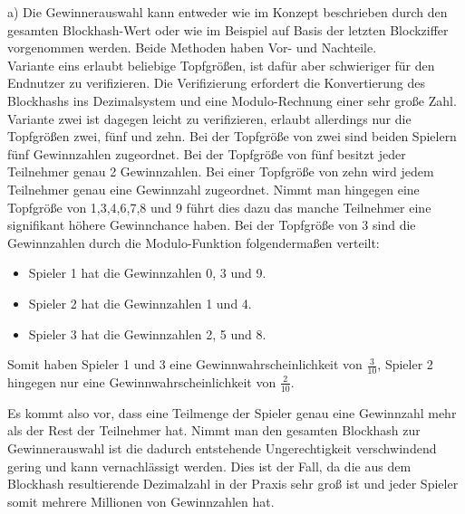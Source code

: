 a) Die Gewinnerauswahl kann entweder wie im Konzept beschrieben durch den gesamten Blockhash-Wert oder wie im Beispiel auf Basis der letzten Blockziffer vorgenommen werden.
Beide Methoden haben Vor- und Nachteile.\\ Variante eins erlaubt beliebige Topfgrößen, ist dafür aber schwieriger für den Endnutzer zu verifizieren. Die Verifizierung erfordert die Konvertierung des Blockhashs ins Dezimalsystem und eine Modulo-Rechnung einer sehr große Zahl.\\ Variante zwei ist dagegen leicht zu verifizieren, erlaubt allerdings nur die Topfgrößen zwei, fünf und zehn. Bei der Topfgröße von zwei sind beiden Spielern fünf Gewinnzahlen zugeordnet. Bei der Topfgröße von fünf besitzt jeder Teilnehmer genau 2 Gewinnzahlen. Bei einer Topfgröße von zehn wird jedem Teilnehmer genau eine Gewinnzahl zugeordnet. 
Nimmt man hingegen eine Topfgröße von 1,3,4,6,7,8 und 9 führt dies dazu das manche Teilnehmer eine signifikant höhere Gewinnchance haben.
Bei der Topfgröße von 3 sind die Gewinnzahlen durch die Modulo-Funktion folgendermaßen verteilt:
\begin{itemize}
\item Spieler 1 hat die Gewinnzahlen 0, 3 und 9.
\item Spieler 2 hat die Gewinnzahlen 1 und 4.
\item Spieler 3 hat die Gewinnzahlen 2, 5 und 8.
\end{itemize}
Somit haben Spieler 1 und 3 eine Gewinnwahrscheinlichkeit von $\frac{3}{10}$, Spieler 2 hingegen nur eine Gewinnwahrscheinlichkeit von $\frac{2}{10}$.

Es kommt also vor, dass eine Teilmenge der Spieler genau eine Gewinnzahl mehr als der Rest der Teilnehmer hat.
Nimmt man den gesamten Blockhash zur Gewinnerauswahl ist die dadurch entstehende Ungerechtigkeit verschwindend gering und kann vernachlässigt werden. Dies ist der Fall, da die aus dem Blockhash resultierende Dezimalzahl in der Praxis sehr groß ist und jeder Spieler somit mehrere Millionen von Gewinnzahlen hat.\\

